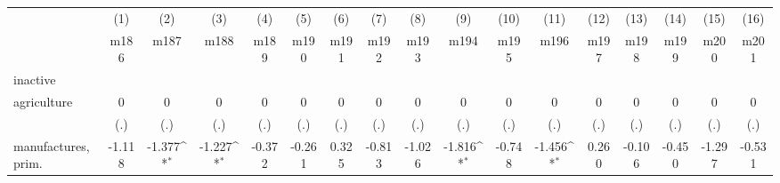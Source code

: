 {
\def\sym#1{\ifmmode^{#1}\else\(^{#1}\)\fi}
\begin{tabular}{l*{16}{c}}
\hline\hline
                    &\multicolumn{1}{c}{(1)}&\multicolumn{1}{c}{(2)}&\multicolumn{1}{c}{(3)}&\multicolumn{1}{c}{(4)}&\multicolumn{1}{c}{(5)}&\multicolumn{1}{c}{(6)}&\multicolumn{1}{c}{(7)}&\multicolumn{1}{c}{(8)}&\multicolumn{1}{c}{(9)}&\multicolumn{1}{c}{(10)}&\multicolumn{1}{c}{(11)}&\multicolumn{1}{c}{(12)}&\multicolumn{1}{c}{(13)}&\multicolumn{1}{c}{(14)}&\multicolumn{1}{c}{(15)}&\multicolumn{1}{c}{(16)}\\
                    &\multicolumn{1}{c}{m186}&\multicolumn{1}{c}{m187}&\multicolumn{1}{c}{m188}&\multicolumn{1}{c}{m189}&\multicolumn{1}{c}{m190}&\multicolumn{1}{c}{m191}&\multicolumn{1}{c}{m192}&\multicolumn{1}{c}{m193}&\multicolumn{1}{c}{m194}&\multicolumn{1}{c}{m195}&\multicolumn{1}{c}{m196}&\multicolumn{1}{c}{m197}&\multicolumn{1}{c}{m198}&\multicolumn{1}{c}{m199}&\multicolumn{1}{c}{m200}&\multicolumn{1}{c}{m201}\\
\hline
inactive            &                     &                     &                     &                     &                     &                     &                     &                     &                     &                     &                     &                     &                     &                     &                     &                     \\
agriculture         &           0         &           0         &           0         &           0         &           0         &           0         &           0         &           0         &           0         &           0         &           0         &           0         &           0         &           0         &           0         &           0         \\
                    &         (.)         &         (.)         &         (.)         &         (.)         &         (.)         &         (.)         &         (.)         &         (.)         &         (.)         &         (.)         &         (.)         &         (.)         &         (.)         &         (.)         &         (.)         &         (.)         \\
[1em]
manufactures, prim. &      -1.118         &      -1.377\sym{*}  &      -1.227\sym{*}  &      -0.372         &      -0.261         &       0.325         &      -0.813         &      -1.026         &      -1.816\sym{*}  &      -0.748         &      -1.456\sym{*}  &       0.260         &      -0.106         &      -0.450         &      -1.297         &      -0.531         \\

\end{tabular}}
